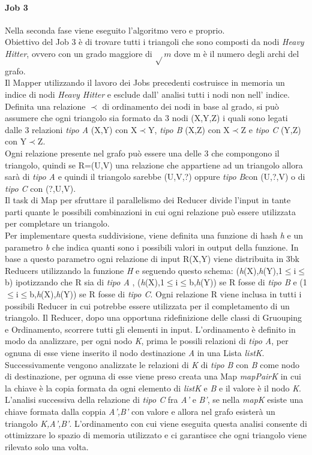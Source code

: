 \documentclass[paper=a4, fontsize=11pt]{scrartcl}	%
\numberwithin{equation}{section}															%
\numberwithin{figure}{section}																%
\numberwithin{table}{section}																%
\begin{document}
\paragraph{Job 3}
Nella seconda fase viene eseguito l'algoritmo vero e proprio.\\
Obiettivo del Job 3 è di trovare tutti i triangoli che sono composti da nodi \textit{Heavy Hitter}, ovvero con un grado maggiore di $\sqrt{} m$ dove m è il numero degli archi del grafo.\\
Il Mapper utilizzando il lavoro dei Jobs precedenti costruisce in memoria un indice di nodi \textit{Heavy Hitter} e esclude dall' analisi tutti i nodi non nell' indice.\\
Definita una relazione $\prec$ di ordinamento dei nodi in base al grado, si può assumere che ogni triangolo sia formato da 3 nodi (X,Y,Z) i quali sono legati dalle 3 relazioni \textit{tipo A} (X,Y) con X$\prec$Y, \textit{tipo B} (X,Z) con X$\prec$Z e \textit{tipo C} (Y,Z) con Y$\prec$Z.\\
Ogni relazione presente nel grafo può essere una delle 3 che compongono il triangolo, quindi se R=(U,V) una relazione che appartiene ad un triangolo allora sarà di \textit{tipo A} e quindi  il triangolo sarebbe (U,V,?) oppure \textit{tipo B}con (U,?,V) o di \textit{tipo C} con (?,U,V).\\
Il task di Map per sfruttare il parallelismo dei Reducer divide l'input in tante parti quante le possibili combinazioni in cui ogni relazione può essere utilizzata per completare un triangolo.\\
Per implementare questa suddivisione, viene definita una funzione di hash \textit{h} e un parametro \textit{b} che indica quanti sono i possibili valori in output della funzione. In base a questo parametro ogni relazione di input R(X,Y) viene distribuita in 3bk Reducers utilizzando la funzione \textit{H} e seguendo questo schema: (\textit{h}(X),\textit{h}(Y),1$\leq$i$\leq$b) ipotizzando che R sia di \textit{tipo A} , (\textit{h}(X),1$\leq$i$\leq$b,\textit{h}(Y)) se R fosse di \textit{tipo B} e (1$\leq$i$\leq$b,\textit{h}(X),\textit{h}(Y)) se R fosse di \textit{tipo C}. Ogni relazione R viene inclusa in tutti i possibili Reducer in cui potrebbe essere utilizzata per il completamento di un triangolo.
Il Reducer, dopo una opportuna ridefinizione delle classi di Gruouping e Ordinamento, scorrere tutti gli elementi in input. L'ordinamento è definito in modo da analizzare, per ogni nodo \textit{K}, prima le possili relazioni di \textit{tipo A}, per ognuna di esse viene inserito il nodo destinazione \textit{A} in una Lista \textit{listK}. Successivamente vengono analizzate le relazioni di \textit{K} di \textit{tipo B} con \textit{B} come nodo di destinazione, per ognuna di esse viene preso creata una Map \textit{mapPairK} in cui la chiave è la copia formata da ogni elemento di \textit{listK} e \textit{B} e il valore è il nodo \textit{K}.
L'analisi successiva della relazione di \textit{tipo C} fra \textit{A'} e \textit{B'}, se nella \textit{mapK} esiste una chiave formata dalla coppia  \textit{A',B'} con valore e allora nel grafo esisterà un triangolo \textit{K,A',B'}.
L'ordinamento con cui viene eseguita questa analisi consente di ottimizzare lo spazio di memoria utilizzato e ci garantisce che ogni triangolo viene rilevato solo una volta.
\end{document}
